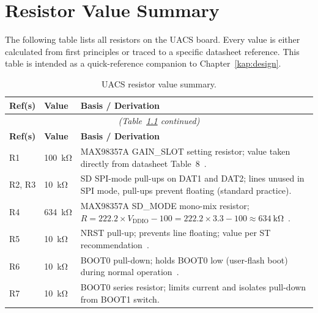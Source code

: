 \chapter{Resistor Value Summary}

The following table lists all resistors on the UACS board. Every value is either
calculated from first principles or traced to a specific datasheet reference. This table
is intended as a quick-reference companion to Chapter~\ref{kap:design}.

\begin{longtable}{p{} p{} p{}}
  \caption{UACS resistor value summary.}
  \label{tab:resistors} \\
  \toprule
  \textbf{Ref(s)} & \textbf{Value} & \textbf{Basis / Derivation} \\
  \midrule
  \endfirsthead

  \multicolumn{3}{c}{\textit{(Table~\ref{tab:resistors} continued)}} \\
  \toprule
  \textbf{Ref(s)} & \textbf{Value} & \textbf{Basis / Derivation} \\
  \midrule
  \endhead

  \bottomrule
  \endlastfoot

  R1
    & \SI{100}{\kilo\ohm}
    & MAX98357A GAIN\_SLOT setting resistor; value taken directly from
      datasheet Table~8~\cite{ref6}. \\[4pt]

  R2, R3
    & \SI{10}{\kilo\ohm}
    & SD SPI-mode pull-ups on DAT1 and DAT2; lines unused in SPI mode,
      pull-ups prevent floating (standard practice). \\[4pt]

  R4
    & \SI{634}{\kilo\ohm}
    & MAX98357A SD\_MODE mono-mix resistor;
      $R = 222.2 \times V_\mathrm{DDIO} - 100 = 222.2 \times 3.3 - 100
      \approx \SI{634}{\kilo\ohm}$~\cite{ref6}. \\[4pt]

  R5
    & \SI{10}{\kilo\ohm}
    & NRST pull-up; prevents line floating; value per ST
      recommendation~\cite{ref1}. \\[4pt]

  R6
    & \SI{10}{\kilo\ohm}
    & BOOT0 pull-down; holds BOOT0 low (user-flash boot) during normal
      operation~\cite{ref1}. \\[4pt]

  R7
    & \SI{10}{\kilo\ohm}
    & BOOT0 series resistor; limits current and isolates pull-down
      from BOOT1 switch. \\[4pt]


\end{longtable}
